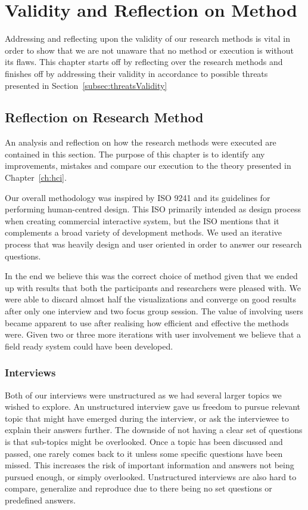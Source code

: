 \chapter{Validity and Reflection on Method}
Addressing and reflecting upon the validity of our research methods is vital in order to show that we are not unaware that no method or execution is without its flaws. This chapter starts off by reflecting over the research methods and finishes off by addressing their validity in accordance to possible threats presented in Section~\ref{subsec:threatsValidity} 

\section{Reflection on Research Method}
An analysis and reflection on how the research methods were executed are contained in this section. The purpose of this chapter is to identify any improvements, mistakes and compare our execution to the theory presented in Chapter~\ref{ch:hci}.

Our overall methodology was inspired by ISO 9241 and its guidelines for performing human-centred design. This ISO primarily intended as design process when creating commercial interactive system, but the ISO mentions that it complements a broad variety of development methods. We used an iterative process that was heavily design and user oriented in order to answer our research questions.

In the end we believe this was the correct choice of method given that we ended up with results that both the participants and researchers were pleased with. We were able to discard almost half the visualizations and converge on good results after only one interview and two focus group session. The value of involving users became apparent to use after realising how efficient and effective the methods were. Given two or three more iterations with user involvement we believe that a field ready system could have been developed. 

\subsection{Interviews}
Both of our interviews were unstructured as we had several larger topics we wished to explore. An unstructured interview gave us freedom to pursue relevant topic that might have emerged during the interview, or ask the interviewee to explain their answers further. The downside of not having a clear set of questions is that sub-topics might be overlooked. Once a topic has been discussed and passed, one rarely comes back to it unless some specific questions have been missed. This increases the risk of important information and answers not being pursued enough, or simply overlooked. Unstructured interviews are also hard to compare, generalize and reproduce due to there being no set questions or predefined answers.

